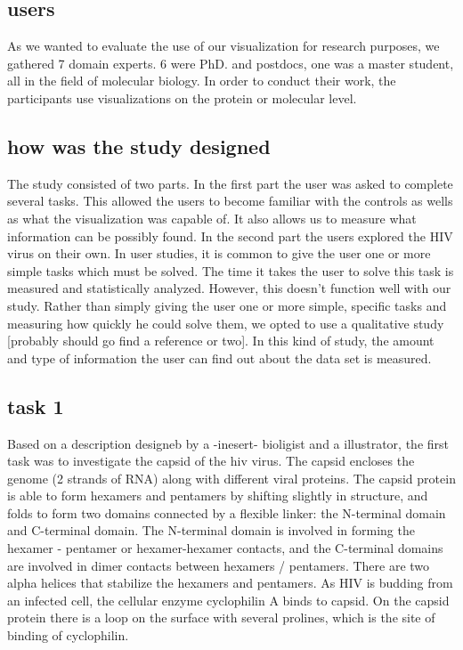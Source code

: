 \documentclass[review,journal]{vgtc}         %
\begin{document}
\subsection{users}
As we wanted to evaluate the use of our visualization for research purposes, we gathered 7 domain experts. 6 were PhD. and postdocs, one was a master student, all in the field of molecular biology. In order to conduct their work, the participants use visualizations on the protein or molecular level.


\subsection{how was the study designed}
The study consisted of two parts. In the first part the user was asked to complete several tasks. This allowed the users to become familiar with the controls as wells as what the visualization was capable of. It also allows us to measure what information can be possibly found.  In the second part the users explored the HIV virus on their own. 
In user studies, it is common to give the user one or more simple tasks which must be solved. The time it takes the user to solve this task is measured and statistically analyzed. However, this doesn't function well with our study. 
Rather than simply giving the user one or more simple, specific tasks and measuring how quickly he could solve them, we opted to use a qualitative study [probably should go find a reference or two]. In this kind of study, the amount and type of information the user can find out about the data set is measured. 


\subsection{task 1}
Based on a description designeb by a -inesert- bioligist and a illustrator, the first task was to investigate the capsid of the hiv virus.
The capsid encloses the genome (2 strands of RNA) along with different viral proteins. The capsid protein is able to form hexamers and pentamers by shifting slightly in structure, and folds to form two domains connected by a flexible linker: the N-terminal domain and C-terminal domain. The N-terminal domain is involved in forming the hexamer - pentamer or hexamer-hexamer contacts, and the C-terminal domains are involved in dimer contacts between hexamers / pentamers. There are two alpha helices that stabilize the hexamers and pentamers. As HIV is budding from an infected cell, the cellular enzyme cyclophilin A binds to capsid. On the capsid protein there is a loop on the surface with several prolines, which is the site of binding of cyclophilin. 
\end{document}

